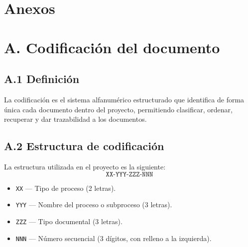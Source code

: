 \documentclass[a4paper,12pt]{article}
\begin{document}
    \section{Anexos}

    \section*{A. Codificación del documento}

    \subsection*{A.1 Definición}
    La codificación es el sistema alfanumérico estructurado que identifica de forma única cada documento dentro del proyecto, permitiendo clasificar, ordenar, recuperar y dar trazabilidad a los documentos.

    \subsection*{A.2 Estructura de codificación}
    La estructura utilizada en el proyecto es la siguiente:
    \[
    \texttt{XX-YYY-ZZZ-NNN}
    \]
    \begin{itemize}
      \item \texttt{XX} — Tipo de proceso (2 letras).
      \item \texttt{YYY} — Nombre del proceso o subproceso (3 letras).
      \item \texttt{ZZZ} — Tipo documental (3 letras).
      \item \texttt{NNN} — Número secuencial (3 dígitos, con relleno a la izquierda).
    \end{itemize}
\end{document}
